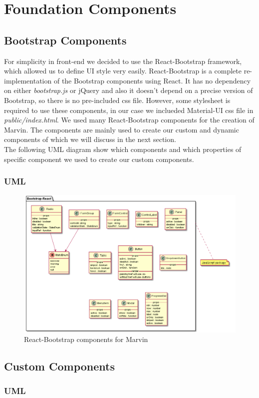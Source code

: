 \section{Foundation Components}

	\subsection{Bootstrap Components} For simplicity in front-end we decided to use the React-Bootstrap framework, which allowed us to define UI style very easily. React-Bootstrap is a complete re-implementation of the Bootstrap components using React. It has no dependency on either \textit{bootstrap.js}  or jQuery and also it doesn't depend on a precise version of Bootstrap, so there is no pre-included css file. However, some stylesheet is required to use these components, in our case we inclueded Material-UI css file in \textit{public/index.html}. We used many React-Bootstrap components for the creation of Marvin. The components are mainly used to create our custom and dynamic components 
	of which we will discuss in the next section. \\ The following UML diagram show which components and which properties of specific component we used to create our custom components. 
	
		\subsubsection{UML}
		\begin{figure}[h]
			\centering
			\includegraphics[width=1\linewidth]{"diagrammi/bootstrap"}
			\caption{React-Bootstrap components for Marvin}
			\label{fig:React-Bootstrap components for Marvin}
		\end{figure}
	\newpage
	\subsection{Custom Components}

		\subsubsection{UML}